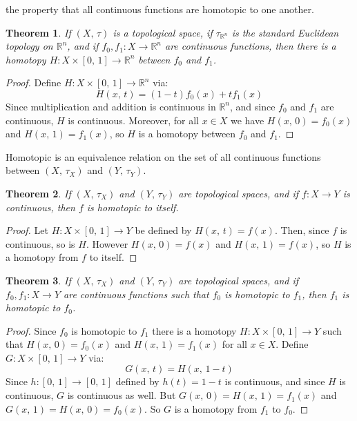 \documentclass{article}
\theoremstyle{plain}
\newtheorem{theorem}{Theorem}[section]
\theoremstyle{normal}
\begin{document}
        the property that all continuous functions are homotopic to one another.
        \begin{theorem}
            If $(X,\,\tau)$ is a topological space, if $\tau_{\mathbb{R}^{n}}$
            is the standard Euclidean topology on $\mathbb{R}^{n}$, and if
            $f_{0},f_{1}:X\rightarrow\mathbb{R}^{n}$ are continuous functions,
            then there is a homotopy $H:X\times[0,\,1]\rightarrow\mathbb{R}^{n}$
            between $f_{0}$ and $f_{1}$.
        \end{theorem}
        \begin{proof}
            Define $H:X\times[0,\,1]\rightarrow\mathbb{R}^{n}$ via:
            \begin{equation}
                H(x,\,t)=(1-t)f_{0}(x)+tf_{1}(x)
            \end{equation}
            Since multiplication and addition is continuous in $\mathbb{R}^{n}$,
            and since $f_{0}$ and $f_{1}$ are continuous, $H$ is continuous.
            Moreover, for all $x\in{X}$ we have $H(x,\,0)=f_{0}(x)$ and
            $H(x,\,1)=f_{1}(x)$, so $H$ is a homotopy between $f_{0}$ and
            $f_{1}$.
        \end{proof}
        Homotopic is an equivalence relation on the set of all continuous
        functions between $(X,\,\tau_{X})$ and $(Y,\,\tau_{Y})$.
        \begin{theorem}
            If $(X,\,\tau_{X})$ and $(Y,\,\tau_{Y})$ are topological spaces,
            and if $f:X\rightarrow{Y}$ is continuous, then $f$ is homotopic to
            itself.
        \end{theorem}
        \begin{proof}
            Let $H:X\times[0,\,1]\rightarrow{Y}$ be defined by
            $H(x,\,t)=f(x)$. Then, since $f$ is continuous, so is $H$. However
            $H(x,\,0)=f(x)$ and $H(x,\,1)=f(x)$, so $H$ is a homotopy from $f$
            to itself.
        \end{proof}
        \begin{theorem}
            If $(X,\,\tau_{X})$ and $(Y,\,\tau_{Y})$ are topological spaces,
            and if $f_{0},f_{1}:X\rightarrow{Y}$ are continuous functions such
            that $f_{0}$ is homotopic to $f_{1}$, then $f_{1}$ is homotopic to
            $f_{0}$.
        \end{theorem}
        \begin{proof}
            Since $f_{0}$ is homotopic to $f_{1}$ there is a homotopy
            $H:X\times[0,\,1]\rightarrow{Y}$ such that $H(x,\,0)=f_{0}(x)$ and
            $H(x,\,1)=f_{1}(x)$ for all $x\in{X}$. Define
            $G:X\times[0,\,1]\rightarrow{Y}$ via:
            \begin{equation}
                G(x,\,t)=H(x,\,1-t)
            \end{equation}
            Since $h:[0,\,1]\rightarrow[0,\,1]$ defined by $h(t)=1-t$ is
            continuous, and since $H$ is continuous, $G$ is continuous as well.
            But $G(x,\,0)=H(x,\,1)=f_{1}(x)$ and $G(x,\,1)=H(x,\,0)=f_{0}(x)$.
            So $G$ is a homotopy from $f_{1}$ to $f_{0}$.
        \end{proof}
\end{document}
